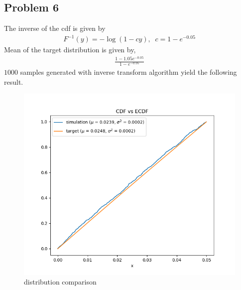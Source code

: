 \documentclass{article}
\begin{document}
\subsection*{Problem 6}
The inverse of the cdf is given by
\begin{align*}
  F^{-1}(y) = -\log(1-cy), \;\; c = 1 - e^{-0.05}
\end{align*}
Mean of the target distribution is given by,
\begin{align*}
  \frac{1-1.05e^{-0.05}}{1-e^{-0.05}}
\end{align*}
$1000$ samples generated with inverse transform algorithm yield the following result.
\begin{figure}[h!]
    \centering
    \includegraphics[width=\linewidth]{../images/p6_dist_it_1000.png}
    \caption{distribution comparison}
\end{figure}
\newpage
\end{document}
